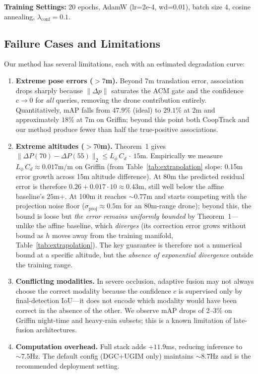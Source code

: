 \documentclass[9.5pt,twocolumn,a4paper]{IEEEtran}
\begin{document}
\textbf{Training Settings:} 20 epochs, AdamW (lr=2e-4, wd=0.01), batch size 4, cosine annealing, $\lambda_{\text{conf}}=0.1$.

\subsection{Failure Cases and Limitations}

Our method has several limitations, each with an estimated degradation curve:

\begin{enumerate}
    \item \textbf{Extreme pose errors ($>7$m).} Beyond 7m translation error, association drops sharply because $\|\Delta p\|$ saturates the ACM gate and the confidence $c \to 0$ for \emph{all} queries, removing the drone contribution entirely. Quantitatively, mAP falls from $47.9\%$ (ideal) to $29.1\%$ at 2m and approximately $18\%$ at 7m on Griffin; beyond this point both CoopTrack and our method produce fewer than half the true-positive associations.

    \item \textbf{Extreme altitudes ($>70$m).} Theorem~1 gives $\|\Delta P(70) - \Delta P(55)\|_2 \le L_\phi\,C_d\,\cdot\,15\text{m}$. Empirically we measure $L_\phi\,C_d \approx 0.017\text{m/m}$ on Griffin (from Table~\ref{tab:extrapolation} slope: 0.15m error growth across 15m altitude difference). At 80m the predicted residual error is therefore $0.26 + 0.017 \cdot 10 \approx 0.43$m, still well below the affine baseline's $25$m+. At 100m it reaches $\sim 0.77$m and starts competing with the projection noise floor ($\sigma_{\text{proj}} \approx 0.5$m for an 80m-range drone); beyond this, the bound is loose but \emph{the error remains uniformly bounded} by Theorem~1---unlike the affine baseline, which \emph{diverges} (its correction error grows without bound as $h$ moves away from the training manifold, Table~\ref{tab:extrapolation}). The key guarantee is therefore not a numerical bound at a specific altitude, but the \emph{absence of exponential divergence} outside the training range.

    \item \textbf{Conflicting modalities.} In severe occlusion, adaptive fusion may not always choose the correct modality because the confidence $c$ is supervised only by final-detection IoU---it does not encode which modality would have been correct in the absence of the other. We observe mAP drops of 2--3\% on Griffin night-time and heavy-rain subsets; this is a known limitation of late-fusion architectures.

    \item \textbf{Computation overhead.} Full stack adds $+11.9$ms, reducing inference to $\sim 7.5$Hz. The default config (DGC+UGIM only) maintains $\sim 8.7$Hz and is the recommended deployment setting.
\end{enumerate}
\end{document}
